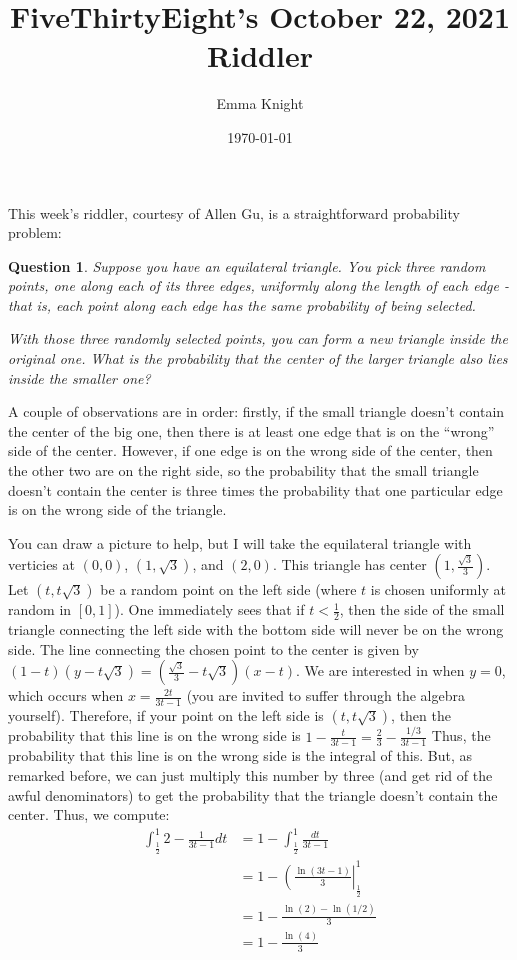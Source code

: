\documentclass[11pt]{article}
\title{FiveThirtyEight's October 22, 2021 Riddler}
\author{Emma Knight}
\date{\today}
\newtheorem{question}[theorem]{Question}
\theoremstyle{definition}
\begin{document}
\maketitle
This week's riddler, courtesy of Allen Gu, is a straightforward probability problem:
\begin{question}
Suppose you have an equilateral triangle. You pick three random points, one along each of its three edges, uniformly along the length of each edge - that is, each point along each edge has the same probability of being selected.

With those three randomly selected points, you can form a new triangle inside the original one. What is the probability that the center of the larger triangle also lies inside the smaller one?
\end{question}
A couple of observations are in order: firstly, if the small triangle doesn't contain the center of the big one, then there is at least one edge that is on the ``wrong'' side of the center.  However, if one edge is on the wrong side of the center, then the other two are on the right side, so the probability that the small triangle doesn't contain the center is three times the probability that one particular edge is on the wrong side of the triangle.

You can draw a picture to help, but I will take the equilateral triangle with verticies at $(0, 0)$, $(1, \sqrt{3})$, and $(2, 0)$.  This triangle has center $(1, \frac{\sqrt{3}}{3})$.  Let $(t, t\sqrt{3})$ be a random point on the left side (where $t$ is chosen uniformly at random in $[0, 1]$).  One immediately sees that if $t < \frac{1}{2}$, then the side of the small triangle connecting the left side with the bottom side will never be on the wrong side.  The line connecting the chosen point to the center is given by $(1-t)(y - t\sqrt{3}) = (\frac{\sqrt{3}}{3} - t\sqrt{3})(x-t)$.  We are interested in when $y = 0$, which occurs when $x = \frac{2t}{3t-1}$ (you are invited to suffer through the algebra yourself).  Therefore, if your point on the left side is $(t, t\sqrt{3})$, then the probability that this line is on the wrong side is $1 - \frac{t}{3t-1} = \frac{2}{3} - \frac{1/3}{3t-1}$  Thus, the probability that this line is on the wrong side is the integral of this.  But, as remarked before, we can just multiply this number by three (and get rid of the awful denominators) to get the probability that the triangle doesn't contain the center.  Thus, we compute:
\begin{align*}
\int_{\frac{1}{2}}^1 2 - \frac{1}{3t-1}dt & = 1 - \int_{\frac{1}{2}}^{1} \frac{dt}{3t-1} \\
& = 1 - \left(\frac{\ln(3t-1)}{3}\right|_{\frac{1}{2}}^1 \\
& = 1 - \frac{\ln(2) - \ln(1/2)}{3} \\
& = 1 - \frac{\ln(4)}{3}
\end{align*}
\end{document}
